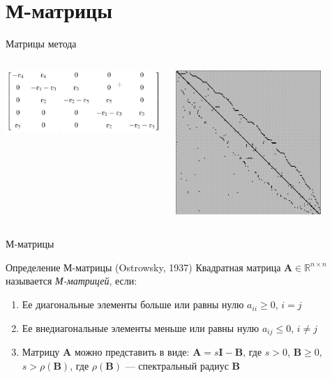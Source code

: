 \documentclass[aspectratio=169]{beamer}
\begin{document}
\section{М-матрицы}
\begin{frame}{Матрицы метода}
\begin{columns}
	\begin{column}{0.5\textwidth}
		\includegraphics[width=\textwidth]{matrix.jpg}
	\end{column}
	\begin{column}{0.5\textwidth}
		\includegraphics[width=0.8\textwidth]{sparse_matrix.jpg}
	\end{column}
\end{columns}
\end{frame}

\begin{frame}{М-матрицы}
\begin{block}{Определение М-матрицы (Ostrowsky, 1937)}
	Квадратная матрица $\mathbf{A} \in \mathbb{R}^{n \times n}$ называется \emph{М-матрицей}, если:
	\begin{enumerate}
		\item Ее диагональные элементы больше или равны нулю $a_{ii} \ge 0$, $i = j$
		\item Ее внедиагональные элементы меньше или равны нулю $a_{ij} \le 0$, $i \neq j$
		\item Матрицу $\mathbf{A}$ можно представить в виде: $\mathbf{A} = s\mathbf{I} - \mathbf{B}$, где $s > 0$, $\mathbf{B} \ge 0$, $s > \rho(\mathbf{B})$, где $\rho(\mathbf{B})$ --- спектральный радиус $\mathbf{B}$
	\end{enumerate}
\end{block}

\end{frame}
\end{document}
